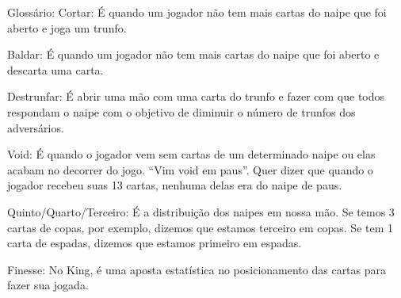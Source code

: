 \begin{subsecao}{Glossário:}
Cortar:  É quando um jogador não tem mais cartas do naipe que foi aberto e joga
um trunfo.

Baldar: É quando um jogador não tem mais cartas do naipe que foi aberto e
descarta uma carta.

Destrunfar: É abrir uma mão com uma carta do trunfo e fazer com que todos
respondam o naipe com o objetivo de diminuir o número de trunfos dos
adversários.

Void: É quando o jogador vem sem cartas de um determinado naipe ou elas acabam
no decorrer do jogo. “Vim void em paus”. Quer dizer que quando o jogador
recebeu suas 13 cartas, nenhuma delas era do naipe de paus.

Quinto/Quarto/Terceiro: É a distribuição dos naipes em nossa mão. Se temos 3
cartas de copas, por exemplo, dizemos que estamos terceiro em copas. Se tem 1
carta de espadas, dizemos que estamos primeiro em espadas.

Finesse: No King, é uma aposta estatística no posicionamento das cartas para
fazer sua jogada.

\end{subsecao}
